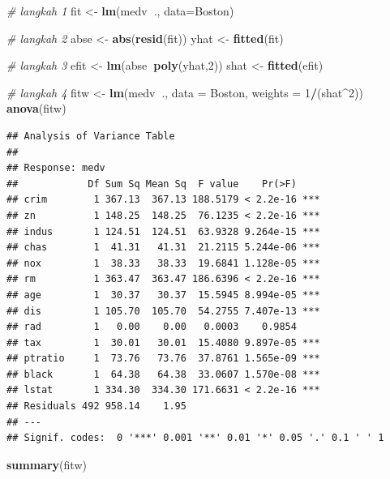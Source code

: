\documentclass[]{book}
\newenvironment{Shaded}{\begin{snugshade}}{\end{snugshade}}
\newcommand{\CommentTok}[1]{\textcolor[rgb]{0.56,0.35,0.01}{\textit{#1}}}
\newcommand{\DataTypeTok}[1]{\textcolor[rgb]{0.13,0.29,0.53}{#1}}
\newcommand{\DecValTok}[1]{\textcolor[rgb]{0.00,0.00,0.81}{#1}}
\newcommand{\KeywordTok}[1]{\textcolor[rgb]{0.13,0.29,0.53}{\textbf{#1}}}
\newcommand{\NormalTok}[1]{#1}
\newcommand{\OperatorTok}[1]{\textcolor[rgb]{0.81,0.36,0.00}{\textbf{#1}}}
\newcommand{\StringTok}[1]{\textcolor[rgb]{0.31,0.60,0.02}{#1}}
\theoremstyle{definition}
\theoremstyle{definition}
\theoremstyle{definition}
\theoremstyle{remark}
\begin{document}
\begin{Shaded}
\begin{Highlighting}[]
\CommentTok{# langkah 1}
\NormalTok{fit <-}\StringTok{ }\KeywordTok{lm}\NormalTok{(medv}\OperatorTok{~}\NormalTok{., }\DataTypeTok{data=}\NormalTok{Boston)}

\CommentTok{# langkah 2}
\NormalTok{abse <-}\StringTok{ }\KeywordTok{abs}\NormalTok{(}\KeywordTok{resid}\NormalTok{(fit))}
\NormalTok{yhat <-}\StringTok{ }\KeywordTok{fitted}\NormalTok{(fit)}

\CommentTok{# langkah 3}
\NormalTok{efit <-}\StringTok{ }\KeywordTok{lm}\NormalTok{(abse}\OperatorTok{~}\KeywordTok{poly}\NormalTok{(yhat,}\DecValTok{2}\NormalTok{))}
\NormalTok{shat <-}\StringTok{ }\KeywordTok{fitted}\NormalTok{(efit)}

\CommentTok{# langkah 4}
\NormalTok{fitw <-}\StringTok{ }\KeywordTok{lm}\NormalTok{(medv}\OperatorTok{~}\NormalTok{., }\DataTypeTok{data =}\NormalTok{ Boston, }\DataTypeTok{weights =} \DecValTok{1}\OperatorTok{/}\NormalTok{(shat}\OperatorTok{^}\DecValTok{2}\NormalTok{))}
\KeywordTok{anova}\NormalTok{(fitw)}
\end{Highlighting}
\end{Shaded}

\begin{verbatim}
## Analysis of Variance Table
## 
## Response: medv
##            Df Sum Sq Mean Sq  F value    Pr(>F)    
## crim        1 367.13  367.13 188.5179 < 2.2e-16 ***
## zn          1 148.25  148.25  76.1235 < 2.2e-16 ***
## indus       1 124.51  124.51  63.9328 9.264e-15 ***
## chas        1  41.31   41.31  21.2115 5.244e-06 ***
## nox         1  38.33   38.33  19.6841 1.128e-05 ***
## rm          1 363.47  363.47 186.6396 < 2.2e-16 ***
## age         1  30.37   30.37  15.5945 8.994e-05 ***
## dis         1 105.70  105.70  54.2755 7.407e-13 ***
## rad         1   0.00    0.00   0.0003    0.9854    
## tax         1  30.01   30.01  15.4080 9.897e-05 ***
## ptratio     1  73.76   73.76  37.8761 1.565e-09 ***
## black       1  64.38   64.38  33.0607 1.570e-08 ***
## lstat       1 334.30  334.30 171.6631 < 2.2e-16 ***
## Residuals 492 958.14    1.95                       
## ---
## Signif. codes:  0 '***' 0.001 '**' 0.01 '*' 0.05 '.' 0.1 ' ' 1
\end{verbatim}

\begin{Shaded}
\begin{Highlighting}[]
\KeywordTok{summary}\NormalTok{(fitw)}
\end{Highlighting}
\end{Shaded}
\end{document}
